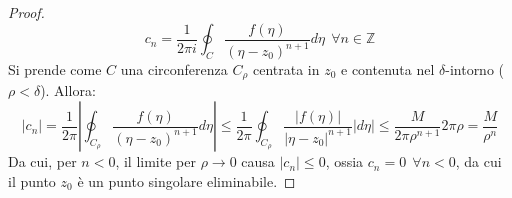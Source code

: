 \documentclass[twoside]{article}
\begin{document}
\begin{enumerate}
\begin{proof}
    \begin{equation}
        c_n=\frac{1}{2\pi i}\oint_C \frac{f(\eta)}{(\eta-z_0)^{n+1}}d\eta \ \ \forall n \in \mathds{Z}
    \end{equation}
    Si prende come $C$ una circonferenza $C_{\rho}$ centrata in $z_0$ e contenuta nel $\delta$-intorno ($\rho < \delta$).
    Allora:
    \begin{equation}
        |c_n|=\frac{1}{2\pi}\left|\oint_{C_{\rho}}\frac{f(\eta)}{(\eta-z_0)^{n+1}}d\eta\right|\leq \frac{1}{2\pi} \oint_{C_{\rho}}\frac{|f(\eta)|}{|\eta - z_0|^{n+1}}|d\eta|\leq \frac{M}{2\pi \rho^{n+1}}2\pi \rho=\frac{M}{\rho^n}
    \end{equation}
    Da cui, per $n<0$, il limite per $\rho \to 0$ causa $|c_n|\leq 0$, ossia $c_n=0 \ \ \forall n<0$, da cui il punto $z_0$ è un punto singolare eliminabile.
    \end{proof}
    

\end{enumerate}
\end{document}
